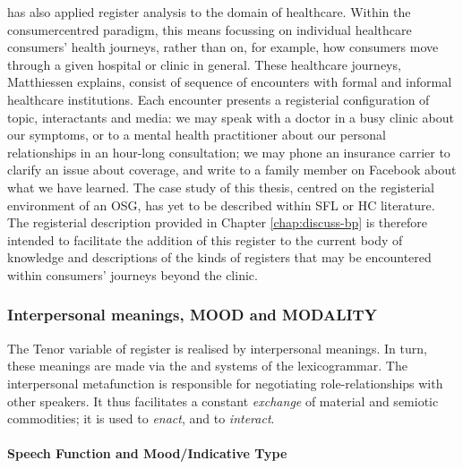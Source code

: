 \textcite{matthiessen_applying_2013} has also applied register analysis to the domain of healthcare. Within the \gls{consumercentred} paradigm, this means focussing on individual healthcare consumers' health journeys, rather than on, for example, how consumers move through a given hospital or clinic in general. These healthcare journeys, Matthiessen explains, consist of sequence of encounters with formal and informal healthcare institutions. Each encounter presents a registerial configuration of topic, interactants and media: we may speak with a doctor in a busy clinic about our symptoms, or to a mental health practitioner about our personal relationships in an hour\hyp{}long consultation; we may phone an insurance carrier to clarify an issue about coverage, and write to a family member on Facebook about what we have learned. The case study of this thesis, centred on the registerial environment of an \gls{OSG}, has yet to be described within \gls{SFL} or \gls{HC} literature. The registerial description provided in Chapter \ref{chap:discuss-bp} is therefore intended to facilitate the addition of this register to the current body of knowledge and descriptions of the kinds of registers that may be encountered within consumers' journeys beyond the clinic.


\subsubsection{Interpersonal meanings, MOOD and MODALITY} \label{sect:mood}

The Tenor variable of register is realised by interpersonal meanings. In turn, these meanings are made via the  and  systems of the \gls{lexicogrammar}. The interpersonal metafunction is responsible for negotiating role\hyp{}relationships with other speakers. It thus facilitates a constant \emph{exchange} of material and semiotic commodities; it is used to \emph{enact}, and to \emph{interact}.

\paragraph{Speech Function and Mood\slash Indicative Type}

